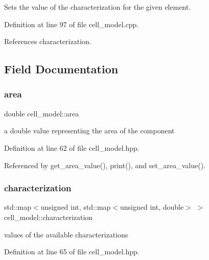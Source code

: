 Sets the value of the characterization for the given element. 



Definition at line 97 of file cell\+\_\+model.\+cpp.



References characterization.



\subsection{Field Documentation}
\mbox{\label{classcell__model_a82047940b26a7d6f10661595f620d37a}} 
\subsubsection{\texorpdfstring{area}{area}}
{\footnotesize\ttfamily double cell\+\_\+model\+::area\hspace{0.3cm}{\ttfamily [protected]}}



a double value representing the area of the component 



Definition at line 62 of file cell\+\_\+model.\+hpp.



Referenced by get\+\_\+area\+\_\+value(), print(), and set\+\_\+area\+\_\+value().

\mbox{\label{classcell__model_a51e5e0da8507b025193cdaeeb6d15b38}} 
\subsubsection{\texorpdfstring{characterization}{characterization}}
{\footnotesize\ttfamily std\+::map$<$unsigned int, std\+::map$<$unsigned int, double$>$ $>$ cell\+\_\+model\+::characterization\hspace{0.3cm}{\ttfamily [protected]}}



values of the available characterizations 



Definition at line 65 of file cell\+\_\+model.\+hpp.



